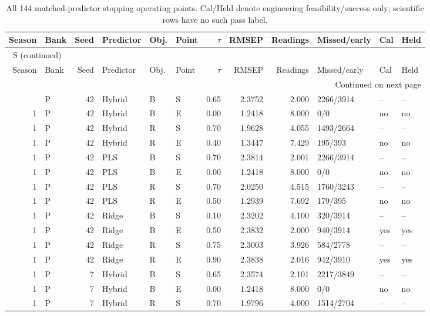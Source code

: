 \documentclass[10pt,a4paper]{article}
\renewcommand{\thetable}{S\arabic{table}}
\begin{document}
\begingroup\footnotesize
\setlength{\tabcolsep}{3.5pt}
\renewcommand{\arraystretch}{1.10}
\begin{longtable}{rlrlllrrrlll}
\caption{All 144 matched-predictor stopping operating points. Cal/Held denote engineering feasibility/success only; scientific rows have no such pass label.}\label{tab:v2adaptive}\\
\toprule
Season & Bank & Seed & Predictor & Obj. & Point & $\tau$ & RMSEP & Readings & Missed/early & Cal & Held \\
\midrule
\endfirsthead
\multicolumn{12}{l}{\tablename~\thetable{} (continued)}\\
\toprule
Season & Bank & Seed & Predictor & Obj. & Point & $\tau$ & RMSEP & Readings & Missed/early & Cal & Held \\
\midrule
\endhead
\midrule
\multicolumn{12}{r}{Continued on next page}\\
\endfoot
\bottomrule
\endlastfoot
1 & P & 42 & Hybrid & B & S & 0.65 & 2.3752 & 2.000 & 2266/3914 & -- & -- \\
1 & P & 42 & Hybrid & B & E & 0.00 & 1.2418 & 8.000 & 0/0 & no & no \\
1 & P & 42 & Hybrid & R & S & 0.70 & 1.9628 & 4.055 & 1493/2664 & -- & -- \\
1 & P & 42 & Hybrid & R & E & 0.40 & 1.3447 & 7.429 & 195/393 & no & no \\
1 & P & 42 & PLS & B & S & 0.70 & 2.3814 & 2.001 & 2266/3914 & -- & -- \\
1 & P & 42 & PLS & B & E & 0.00 & 1.2418 & 8.000 & 0/0 & no & no \\
1 & P & 42 & PLS & R & S & 0.70 & 2.0250 & 4.515 & 1760/3243 & -- & -- \\
1 & P & 42 & PLS & R & E & 0.50 & 1.2939 & 7.692 & 179/395 & no & no \\
1 & P & 42 & Ridge & B & S & 0.10 & 2.3202 & 4.100 & 320/3914 & -- & -- \\
1 & P & 42 & Ridge & B & E & 0.50 & 2.3832 & 2.000 & 940/3914 & yes & yes \\
1 & P & 42 & Ridge & R & S & 0.75 & 2.3003 & 3.926 & 584/2778 & -- & -- \\
1 & P & 42 & Ridge & R & E & 0.90 & 2.3838 & 2.016 & 942/3910 & yes & yes \\
1 & P & 7 & Hybrid & B & S & 0.65 & 2.3574 & 2.101 & 2217/3849 & -- & -- \\
1 & P & 7 & Hybrid & B & E & 0.00 & 1.2418 & 8.000 & 0/0 & no & no \\
1 & P & 7 & Hybrid & R & S & 0.70 & 1.9796 & 4.000 & 1514/2704 & -- & -- \\

\end{longtable}
\end{document}
